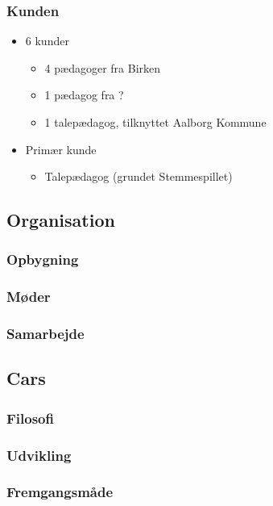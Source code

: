 \begin{frame}
\frametitle{Kunden}

\begin{itemize}
\item 6 kunder
\begin{itemize}
\item 4 pædagoger fra Birken
\item 1 pædagog fra ?
\item 1 talepædagog, tilknyttet Aalborg Kommune
\end{itemize}
\item Primær kunde
\begin{itemize}
\item Talepædagog (grundet Stemmespillet)
\end{itemize}
\end{itemize}

\end{frame}

\subsection{Organisation}

\begin{frame}
\frametitle{Opbygning}

\end{frame}

\begin{frame}
\frametitle{Møder}

\end{frame}

\begin{frame}
\frametitle{Samarbejde}

\end{frame}

\subsection{Cars}

\begin{frame}
\frametitle{Filosofi}

\end{frame}

\begin{frame}
\frametitle{Udvikling}

\end{frame}

\begin{frame}
\frametitle{Fremgangsmåde}

\end{frame}